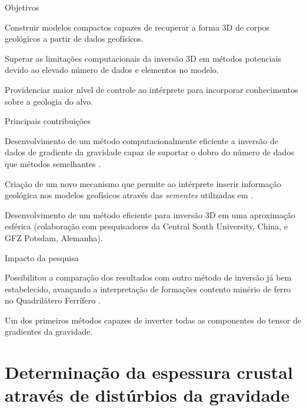 \documentclass[10pt,a4paper,oneside]{book}
\begin{document}
\begin{fancyenum}{\faBullseye}{Objetivos}
   \item Construir modelos compactos capazes de recuperar a forma 3D de corpos
     geológicos a partir de dados geofísicos.
   \item Superar as limitações computacionais da inversão 3D em métodos
     potenciais devido ao elevado número de dados e elementos no modelo.
   \item Providenciar maior nível de controle ao intérprete para incorporar
     conhecimentos sobre a geologia do alvo.
\end{fancyenum}
\begin{fancyenum}{\faLightbulb}{Principais contribuições}
  \item Desenvolvimento de um método computacionalmente eficiente a inversão
    de dados de gradiente da gravidade capaz de suportar o dobro do número
    de dados que métodos semelhantes \citep{Uieda2012,Carlos2016}.
  \item Criação de um novo mecanismo que permite ao intérprete inserir
    informação geológica nos modelos geofísicos através das \textit{sementes}
    utilizadas em \citet{Uieda2012}.
  \item Desenvolvimento de um método eficiente para inversão 3D em uma
    aproximação esférica \citep{Zhao2019} (colaboração com pesquisadores da
    Central South University, China, e GFZ Potsdam, Alemanha).
\end{fancyenum}
\begin{fancyenum}{\faRocket}{Impacto da pesquisa}
  \item Possibilitou a comparação dos resultados com outro método de inversão
    já bem estabelecido, avançando a interpretação de formações contento
    minério de ferro no Quadrilátero Ferrífero \citep{Carlos2014,Carlos2016}.
  \item Um dos primeiros métodos capazes de inverter todas as componentes do
    tensor de gradientes da gravidade.
\end{fancyenum}


\section{Determinação da espessura crustal através de distúrbios da gravidade}
\end{document}
